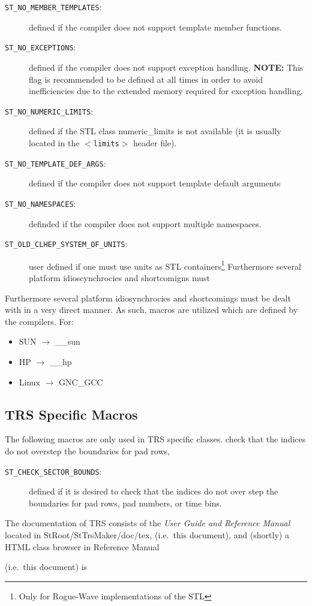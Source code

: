 \documentclass[twoside]{article}
\newcommand{\name}[1]{\textsf{#1}}%
\newcommand{\comp}[1]{\texttt{#1}}%
\begin{document}
{\begin{description}
\item[\comp{ST\_NO\_MEMBER\_TEMPLATES}:] defined if the compiler does not support template
    member functions. 
\item[\comp{ST\_NO\_EXCEPTIONS}:] defined  if the compiler does not support exception
    handling. {\bf NOTE:} This flag is recommended to be defined at all times in order to
avoid inefficiencies due to the extended memory required for exception 
handling. 
\item[\comp{ST\_NO\_NUMERIC\_LIMITS}:] defined if the STL class \name{numeric\_limits}
    is not available (it is usually located in the $<$\comp{limits}$>$ header file).
\item[\comp{ST\_NO\_TEMPLATE\_DEF\_ARGS}:] defined if the compiler does not support
    template default arguments
\item[\comp{ST\_NO\_NAMESPACES}:] definded if the compiler does not support
  multiple namespaces.
\item[\comp{ST\_OLD\_CLHEP\_SYSTEM\_OF\_UNITS}:] user defined if one must use units as
STL  containers\footnote{Only for Rogue-Wave  
        implementations of the STL}
Furthermore several platform idioscynchrocies and shortcomigns must
\end{description}

Furthermore several platform idiosynchrocies and shortcomings must
be dealt with in a very direct manner.  As such, macros are utilized
which are defined by the compilers. For:
\begin{itemize}
  \item SUN $\rightarrow$ \_\_sun
  \item HP  $\rightarrow$ \_\_hp
  \item Linux $\rightarrow$ GNC\_GCC
\end{itemize}

\subsection{\name{TRS} Specific Macros}

The following macros are only used in TRS specific classes.
    check that the indices do not overstep the boundaries for pad rows,
\begin{description}
  \item[\comp{ST\_CHECK\_SECTOR\_BOUNDS}:] defined if it is desired to
    check that the indices do not over step the boundaries for pad rows,
    pad numbers, or time bins.
\end{description}

The documentation of \name{TRS} consists of the {\em User Guide and
    Reference Manual} located in \name{StRoot/StTrsMaker/doc/tex}, 
(i.e.~this document), and (shortly) a \name{HTML} class browser in
    Reference Manual} (i.e.~this document) is 
\end{document}
